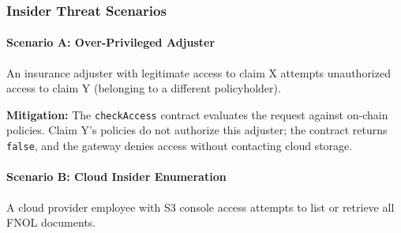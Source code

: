 \documentclass[pdflatex,sn-mathphys-num]{sn-jnl}
\begin{document}






\subsubsection{Insider Threat Scenarios}

\paragraph{Scenario A: Over-Privileged Adjuster}
An insurance adjuster with legitimate access to claim X attempts unauthorized access to claim Y (belonging to a different policyholder).

\textbf{Mitigation:} The \texttt{checkAccess} contract evaluates the request against on-chain policies. Claim Y's policies do not authorize this adjuster; the contract returns \texttt{false}, and the gateway denies access without contacting cloud storage.

\paragraph{Scenario B: Cloud Insider Enumeration}
A cloud provider employee with S3 console access attempts to list or retrieve all FNOL documents.
\end{document}
